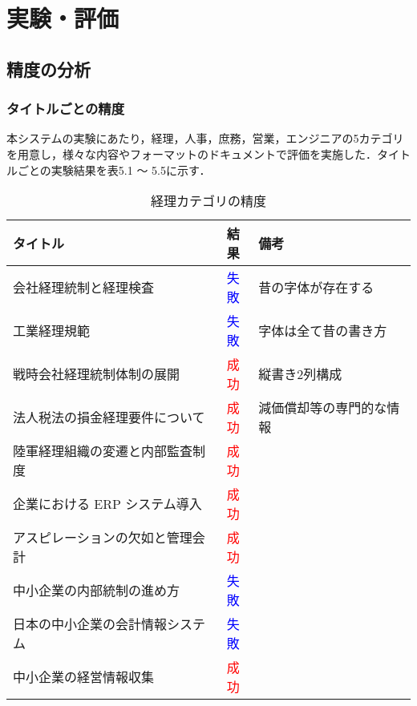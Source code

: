 \chapter{実験・評価}
\label{ch:exp}
\quad

\section{精度の分析}
\label{sec:exp_anal}

\subsection{タイトルごとの精度}
\label{subsec:title}

本システムの実験にあたり，経理，人事，庶務，営業，エンジニアの5カテゴリを用意し，様々な内容やフォーマットのドキュメントで評価を実施した．タイトルごとの実験結果を表5.1 ～ 5.5に示す．

\begin{table}[h]
  \label{tab:doc_accounting}
  \begin{center}
  \begin{tabular}{|l|c|l|}
    \hline
    \textbf{タイトル} & \textbf{結果} & \textbf{備考} \\ \hline
    会社経理統制と経理検査 & \textcolor{blue}{失敗} & 昔の字体が存在する \\ \hline
    工業経理規範 & \textcolor{blue}{失敗} & 字体は全て昔の書き方 \\ \hline
    戦時会社経理統制体制の展開 & \textcolor{red}{成功} & 縦書き2列構成 \\ \hline
    法人税法の損金経理要件について & \textcolor{red}{成功} & 減価償却等の専門的な情報 \\ \hline
    陸軍経理組織の変遷と内部監査制度 & \textcolor{red}{成功} & \\ \hline
    企業における ERP システム導入 & \textcolor{red}{成功} & \\ \hline
    アスピレーションの欠如と管理会計 & \textcolor{red}{成功} & \\ \hline
    中小企業の内部統制の進め方 & \textcolor{blue}{失敗} & \\ \hline
    日本の中小企業の会計情報システム & \textcolor{blue}{失敗} & \\ \hline
    中小企業の経営情報収集 & \textcolor{red}{成功} & \\ \hline
  \end{tabular}
  \end{center}
  \caption{経理カテゴリの精度}
\end{table}
\clearpage

